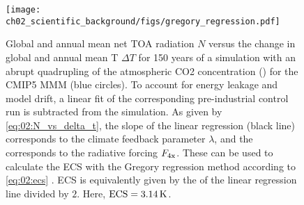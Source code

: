 \begin{figure}[t]
  \centering
  \texttt{[image: 
    ch02\_scientific\_background/figs/gregory\_regression.pdf]}
  \caption[
    Gregory regression for the \acs{CMIP}5 \acl{MMM} illustrating the
    definition of the \acf{ECS}.
  ]{
    Global and annual mean net \acf{TOA} radiation $N$ versus the change in
    global and annual mean \acl{T} $\Delta T$ for 150 years of a simulation
    with an abrupt quadrupling of the atmospheric \acs{CO2} concentration
    () for the \acs{CMIP}5 \acl{MMM} (blue circles). To account for
    energy leakage and model drift, a linear fit of the corresponding
    pre-industrial control run is subtracted from the  simulation.
    As given by \cref{eq:02:N_vs_delta_t}, the slope of the linear regression
    (black line) corresponds to the climate feedback parameter $\lambda$, and
    the \yintercept{} corresponds to the radiative forcing $F_\mathtxt{4x}$.
    These can be used to calculate the \acf{ECS} with the Gregory regression
    method according to \cref{eq:02:ecs} \autocite{Gregory2004}. \acs{ECS} is
    equivalently given by the \xintercept{} of the linear regression line
    divided by $2$. Here, $\mathtxt{ECS} = 3.14 \unit{K}$.
  }
  \label{fig:02:gregory_regression}
\end{figure}

